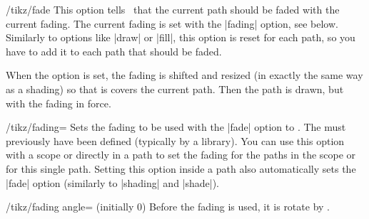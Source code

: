 
\begin{key}{/tikz/fade}
  This option tells \tikzname\ that the current path should be faded
  with the current fading. The current fading is set with the |fading|
  option, see below. Similarly to options like |draw| or |fill|,
  this option is reset for each path, so you have to add it to each
  path that should be faded.

  When the option is set, the fading is shifted and resized (in
  exactly the same way as a shading) so that is covers the current
  path. Then the path is drawn, but with the fading in force.
\begin{codeexample}[]
\end{codeexample}

  \begin{key}{/tikz/fading=}
    Sets the fading to be used with the |fade| option to
    . The  must previously have been defined
    (typically by a library). You can use this option with a scope or
    directly in a path to set the fading for the paths in the scope or
    for this single path. Setting this option inside a path also
    automatically sets the |fade| option (similarly to |shading| and
    |shade|).  
  \end{key}

  \begin{key}{/tikz/fading angle= (initially 0)}
    Before the fading is used, it is rotate by .

\begin{codeexample}[]
\end{codeexample}
\end{key}
\end{key}
